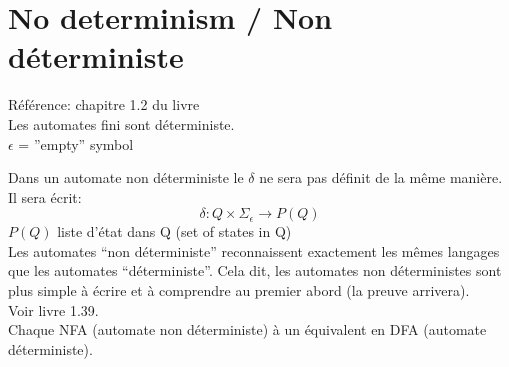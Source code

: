 \documentclass[a4paper,12pt]{article}
\begin{document}
\section{No determinism / Non déterministe}
  Référence: chapitre 1.2 du livre\\
  Les automates fini sont déterministe.\\
  $\epsilon$ = ''empty'' symbol
  
  
  Dans un automate non déterministe le $\delta$ ne sera pas définit de la même manière.  Il sera écrit:
  $$\delta : Q \times \Sigma_{\epsilon} \rightarrow P(Q)$$
  $P(Q)$ liste d'état dans Q (set of states in Q)\\
  Les automates ``non déterministe'' reconnaissent exactement les mêmes langages que les automates ``déterministe''.  Cela dit, les automates non déterministes sont plus simple à écrire et à comprendre au premier abord (la preuve arrivera).\\
  Voir livre 1.39.\\
  Chaque NFA (automate non déterministe) à un équivalent en DFA (automate déterministe).
  
  
  
\end{document}
